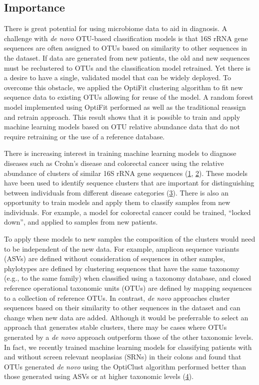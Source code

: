 \documentclass[
]{article}
\begin{document}
\newpage

\hypertarget{importance}{%
\subsection{Importance}\label{importance}}

There is great potential for using microbiome data to aid in diagnosis.
A challenge with \emph{de novo} OTU-based classification models is that
16S rRNA gene sequences are often assigned to OTUs based on similarity
to other sequences in the dataset. If data are generated from new
patients, the old and new sequences must be reclustered to OTUs and the
classification model retrained. Yet there is a desire to have a single,
validated model that can be widely deployed. To overcome this obstacle,
we applied the OptiFit clustering algorithm to fit new sequence data to
existing OTUs allowing for reuse of the model. A random forest model
implemented using OptiFit performed as well as the traditional reassign
and retrain approach. This result shows that it is possible to train and
apply machine learning models based on OTU relative abundance data that
do not require retraining or the use of a reference database.

\newpage

There is increasing interest in training machine learning models to
diagnose diseases such as Crohn's disease and colorectal cancer using
the relative abundance of clusters of similar 16S rRNA gene sequences
(\protect\hyperlink{ref-baxter2016}{1},
\protect\hyperlink{ref-gevers2014}{2}). These models have been used to
identify sequence clusters that are important for distinguishing between
individuals from different disease categories
(\protect\hyperlink{ref-duvallet2017}{3}). There is also an opportunity
to train models and apply them to classify samples from new individuals.
For example, a model for colorectal cancer could be trained, ``locked
down'', and applied to samples from new patients.

To apply these models to new samples the composition of the clusters
would need to be independent of the new data. For example, amplicon
sequence variants (ASVs) are defined without consideration of sequences
in other samples, phylotypes are defined by clustering sequences that
have the same taxonomy (e.g., to the same family) when classified using
a taxonomy database, and closed reference operational taxonomic units
(OTUs) are defined by mapping sequences to a collection of reference
OTUs. In contrast, \emph{de novo} approaches cluster sequences based on
their similarity to other sequences in the dataset and can change when
new data are added. Although it would be preferrable to select an
approach that generates stable clusters, there may be cases where OTUs
generated by a \emph{de novo} approach outperform those of the other
taxonomic levels. In fact, we recently trained machine learning models
for classifying patients with and without screen relevant neoplasias
(SRNs) in their colons and found that OTUs generated \emph{de novo}
using the OptiClust algorithm performed better than those generated
using ASVs or at higher taxonomic levels
(\protect\hyperlink{ref-Armour2022}{4}).
\end{document}

